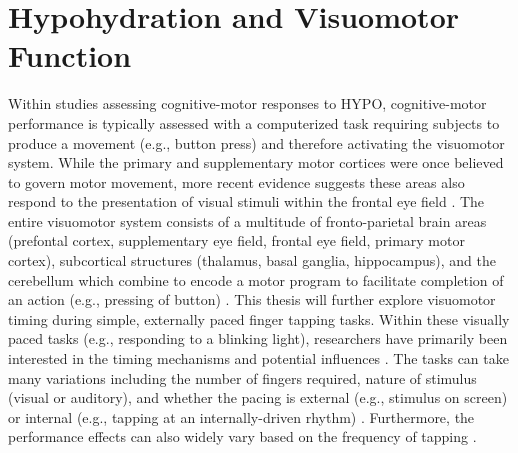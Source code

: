 \section{Hypohydration and Visuomotor Function}
Within studies assessing cognitive-motor responses to HYPO, cognitive-motor performance is typically assessed with a computerized task requiring subjects to produce a movement (e.g., button press) and therefore activating the visuomotor system. While the primary and supplementary motor cortices were once believed to govern motor movement, more recent evidence suggests these areas also respond to the presentation of visual stimuli within the frontal eye field \cite{fadiga_visuomotor_2000}. The entire visuomotor system consists of a multitude of fronto-parietal brain areas (prefontal cortex, supplementary eye field, frontal eye field, primary motor cortex), subcortical structures (thalamus, basal ganglia, hippocampus), and the cerebellum which combine to encode a motor program to facilitate completion of an action (e.g., pressing of button) \cite{murray_role_2000}. This thesis will further explore visuomotor timing during simple, externally paced finger tapping tasks. Within these visually paced tasks (e.g., responding to a blinking light), researchers have primarily been interested in the timing mechanisms and potential influences \cite{ruspantini_considerations_2011}. The tasks can take many variations including the number of fingers required, nature of stimulus (visual or auditory), and whether the pacing is external (e.g., stimulus on screen) or internal (e.g., tapping at an internally-driven rhythm) \cite{witt_functional_2008}. Furthermore, the performance effects can also widely vary based on the frequency of tapping \cite{bove_effects_2007}.

